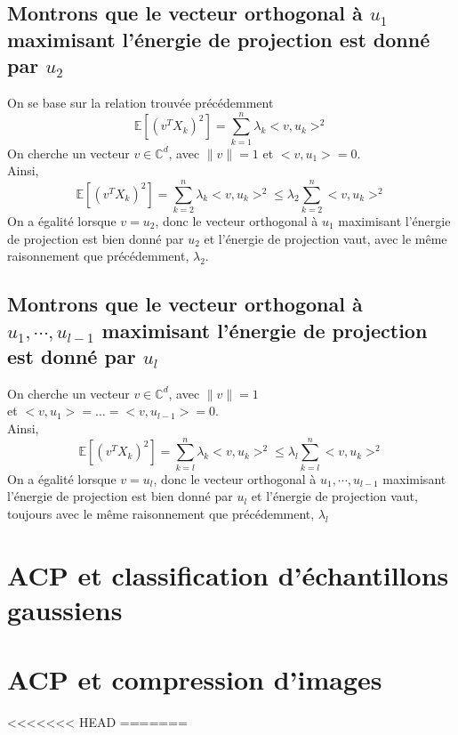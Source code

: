 \documentclass{report}
\begin{document}
		\subsection{Montrons que le vecteur orthogonal à $u_1$ maximisant l'énergie de projection est donné par $u_2$}
			On se base sur la relation trouvée précédemment
			\[ \mathbb{E}[(v^TX_k)^2] = \sum\limits_{k=1}^n \lambda_k<v, u_k>^2 \]
			On cherche un vecteur $v \in \mathbb{C}^d$, avec $\lVert v \rVert = 1$ et $<v, u_1> = 0$. \\
			Ainsi, 
			\[ \mathbb{E}[(v^TX_k)^2] = \sum\limits_{k=2}^n \lambda_k<v, u_k>^2 \leq \lambda_2\sum\limits_{k=2}^n <v, u_k>^2 \]
			On a égalité lorsque $v=u_2$, donc le vecteur orthogonal à $u_1$ maximisant l'énergie de projection est bien donné par $u_2$ et l'énergie de projection vaut, avec le même raisonnement que précédemment, $\lambda_2$.
		\subsection{Montrons que le vecteur orthogonal à $u_1, \cdots, u_{l-1}$ maximisant l'énergie de projection est donné par $u_l$}
			On cherche un vecteur $v \in \mathbb{C}^d$, avec $\lVert v \rVert = 1$ \\
			et $<v, u_1> = \ldots = <v, u_{l-1}> = 0$. \\
			Ainsi, 
			\[ \mathbb{E}[(v^TX_k)^2] = \sum\limits_{k=l}^n \lambda_k<v, u_k>^2 \leq \lambda_l\sum\limits_{k=l}^n <v, u_k>^2 \]
			On a égalité lorsque $v=u_l$, donc le vecteur orthogonal à $u_1, \cdots, u_{l-1}$ maximisant l'énergie de projection est bien donné par $u_l$ et l'énergie de projection vaut, toujours avec le même raisonnement que précédemment, $\lambda_l$

	\section{ACP et classification d'échantillons gaussiens}
	\section{ACP et compression d'images}
<<<<<<< HEAD
=======
\end{document}
